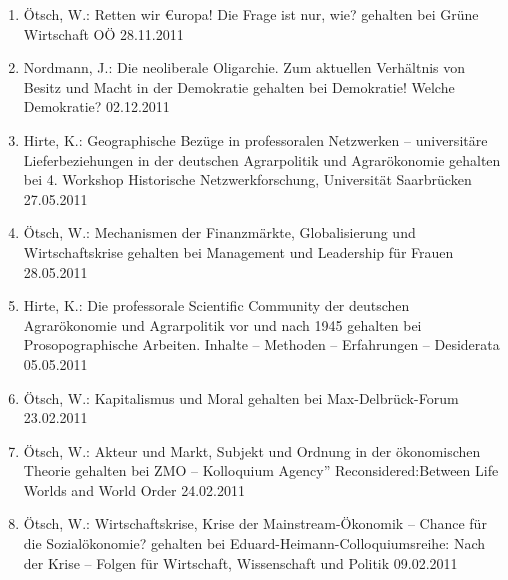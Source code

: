 \begin{enumerate}
	\item Ötsch, W.: Retten wir €uropa! Die Frage ist nur, wie? gehalten bei Grüne Wirtschaft OÖ 28.11.2011
	\item Nordmann, J.: Die neoliberale Oligarchie. Zum aktuellen Verhältnis von Besitz und Macht in der Demokratie gehalten bei Demokratie! Welche Demokratie? 02.12.2011
	\item Hirte, K.: Geographische Bezüge in professoralen Netzwerken -- universitäre Lieferbeziehungen in der deutschen Agrarpolitik und Agrarökonomie gehalten bei 4. Workshop Historische Netzwerkforschung, Universität Saarbrücken 27.05.2011
	\item Ötsch, W.: Mechanismen der Finanzmärkte, Globalisierung und Wirtschaftskrise gehalten bei Management und Leadership für Frauen 28.05.2011
	\item Hirte, K.: Die professorale Scientific Community der deutschen Agrarökonomie und Agrarpolitik vor und nach 1945 gehalten bei Prosopographische Arbeiten. Inhalte -- Methoden -- Erfahrungen -- Desiderata 05.05.2011
	\item Ötsch, W.: Kapitalismus und Moral gehalten bei Max-Delbrück-Forum 23.02.2011
	\item Ötsch, W.: Akteur und Markt, Subjekt und Ordnung in der ökonomischen Theorie gehalten bei ZMO -- Kolloquium \glqq Agency” Reconsidered:Between Life Worlds and World Order\grqq{} 24.02.2011
	\item Ötsch, W.: Wirtschaftskrise, Krise der Mainstream-Ökonomik -- Chance für die Sozialökonomie? gehalten bei Eduard-Heimann-Colloquiumsreihe: Nach der Krise -- Folgen für Wirtschaft, Wissenschaft und Politik 09.02.2011
\end{enumerate}
